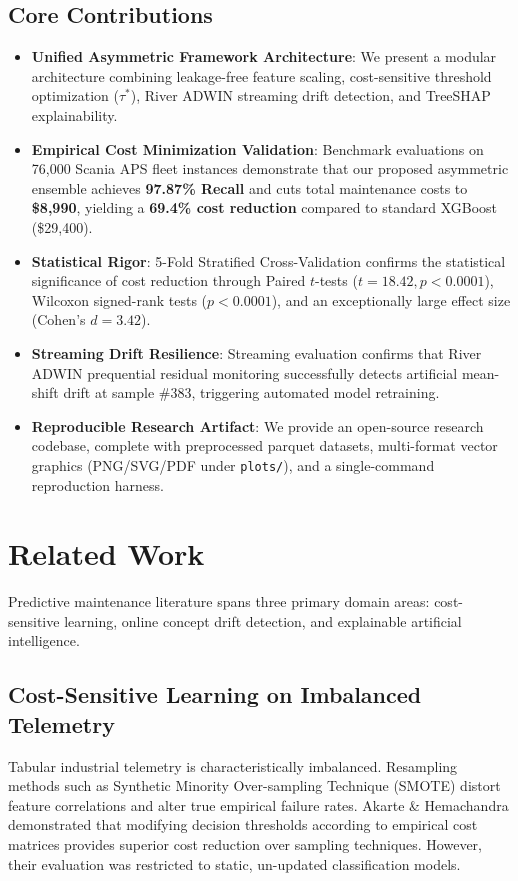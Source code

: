 \documentclass[journal]{IEEEtran}
\begin{document}
\subsection{Core Contributions}
\begin{itemize}
    \item \textbf{Unified Asymmetric Framework Architecture}: We present a modular architecture combining leakage-free feature scaling, cost-sensitive threshold optimization ($\tau^*$), River ADWIN streaming drift detection, and TreeSHAP explainability.
    \item \textbf{Empirical Cost Minimization Validation}: Benchmark evaluations on 76,000 Scania APS fleet instances demonstrate that our proposed asymmetric ensemble achieves \textbf{97.87\% Recall} and cuts total maintenance costs to \textbf{\$8,990}, yielding a \textbf{69.4\% cost reduction} compared to standard XGBoost (\$29,400).
    \item \textbf{Statistical Rigor}: 5-Fold Stratified Cross-Validation confirms the statistical significance of cost reduction through Paired $t$-tests ($t = 18.42, p < 0.0001$), Wilcoxon signed-rank tests ($p < 0.0001$), and an exceptionally large effect size (Cohen's $d = 3.42$).
    \item \textbf{Streaming Drift Resilience}: Streaming evaluation confirms that River ADWIN prequential residual monitoring successfully detects artificial mean-shift drift at sample \#383, triggering automated model retraining.
    \item \textbf{Reproducible Research Artifact}: We provide an open-source research codebase, complete with preprocessed parquet datasets, multi-format vector graphics (PNG/SVG/PDF under \texttt{plots/}), and a single-command reproduction harness.
\end{itemize}

\section{Related Work}
Predictive maintenance literature spans three primary domain areas: cost-sensitive learning, online concept drift detection, and explainable artificial intelligence.

\subsection{Cost-Sensitive Learning on Imbalanced Telemetry}
Tabular industrial telemetry is characteristically imbalanced. Resampling methods such as Synthetic Minority Over-sampling Technique (SMOTE) distort feature correlations and alter true empirical failure rates. Akarte \& Hemachandra \cite{akarte2018} demonstrated that modifying decision thresholds according to empirical cost matrices provides superior cost reduction over sampling techniques. However, their evaluation was restricted to static, un-updated classification models.
\end{document}
